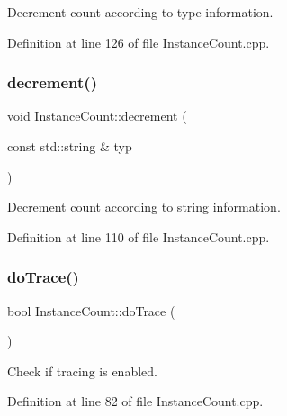 Decrement count according to type information. 



Definition at line 126 of file Instance\+Count.\+cpp.

\hypertarget{struct_d_d4hep_1_1_instance_count_a5c0cdd835f58abbd7f1d54069b5f04b2}{}\label{struct_d_d4hep_1_1_instance_count_a5c0cdd835f58abbd7f1d54069b5f04b2} 
\subsubsection{\texorpdfstring{decrement()}{decrement()}\hspace{0.1cm}{\footnotesize\ttfamily [3/3]}}
{\footnotesize\ttfamily void Instance\+Count\+::decrement (\begin{DoxyParamCaption}\item[{const std\+::string \&}]{typ }\end{DoxyParamCaption})\hspace{0.3cm}{\ttfamily [static]}}



Decrement count according to string information. 



Definition at line 110 of file Instance\+Count.\+cpp.

\hypertarget{struct_d_d4hep_1_1_instance_count_afa4f90d11074c40ba3bde59bb5c59785}{}\label{struct_d_d4hep_1_1_instance_count_afa4f90d11074c40ba3bde59bb5c59785} 
\subsubsection{\texorpdfstring{do\+Trace()}{doTrace()}}
{\footnotesize\ttfamily bool Instance\+Count\+::do\+Trace (\begin{DoxyParamCaption}{ }\end{DoxyParamCaption})\hspace{0.3cm}{\ttfamily [static]}}



Check if tracing is enabled. 



Definition at line 82 of file Instance\+Count.\+cpp.



